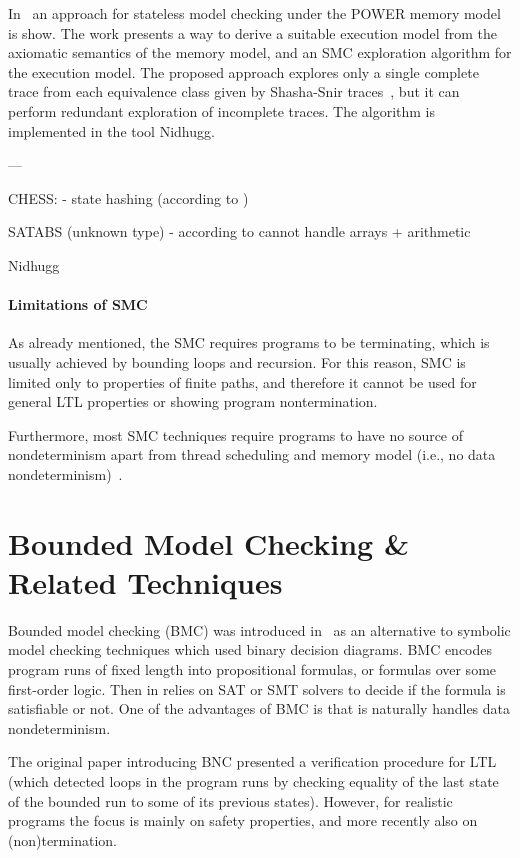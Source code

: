 In~\cite{Abdulla2016} an approach for stateless model checking under the POWER memory model is show.
The work presents a way to derive a suitable execution model from the axiomatic semantics of the memory model, and an SMC exploration algorithm for the execution model.
The proposed approach explores only a single complete trace from each equivalence class given by Shasha-Snir traces~\cite{Shasha1988}, but it can perform redundant exploration of incomplete traces. 
The algorithm is implemented in the tool Nidhugg.


---

CHESS:
- state hashing (according to \cite{Cordeiro2011})


SATABS (unknown type)
- according to \cite{Cordeiro2011} cannot handle arrays + arithmetic

Nidhugg~\cite{Abdulla2017}



\paragraph{Limitations of SMC}

As already mentioned, the SMC requires programs to be terminating, which is
usually achieved by bounding loops and recursion.
For this reason, SMC is limited only to properties of finite paths, and
therefore it cannot be used for general LTL properties or showing program
nontermination.

Furthermore, most SMC techniques require programs to have no source of
nondeterminism apart from thread scheduling and memory model (i.e., no data
nondeterminism)~\cite{Abdulla2017}.


\section{Bounded Model Checking \& Related Techniques}

Bounded model checking (BMC) was introduced in~\cite{Biere1999} as an alternative to
symbolic model checking techniques which used binary decision diagrams.
BMC encodes program runs of fixed length into propositional formulas, or
formulas over some first-order logic.
Then in relies on SAT or SMT solvers to decide if the formula is satisfiable or
not.
One of the advantages of BMC is that is naturally handles data nondeterminism.

The original paper introducing BNC presented a verification procedure for LTL
(which detected loops in the program runs by checking equality of the last
state of the bounded run to some of its previous states).
However, for realistic programs the focus is mainly on safety properties, and
more recently also on (non)termination.

